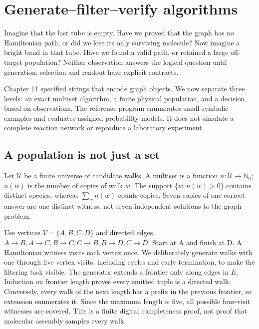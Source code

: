 \chapter{Generate--filter--verify algorithms}
Imagine that the last tube is empty. Have we proved that the graph has no
Hamiltonian path, or did we lose its only surviving molecule? Now imagine
a bright band in that tube. Have we found a valid path, or retained a large
off-target population? Neither observation answers the logical question until
generation, selection and readout have explicit contracts.

Chapter 11 specified strings that encode graph objects. We now separate
three levels: an exact multiset algorithm, a finite physical population,
and a decision based on observations. The reference program enumerates
small symbolic examples and evaluates assigned probability models. It does
not simulate a complete reaction network or reproduce a laboratory experiment.

\section{A population is not just a set}
Let $\mathcal U$ be a finite universe of candidate walks. A multiset is a
function $n:\mathcal U\to\mathbb N_0$; $n(w)$ is the number of copies of
walk $w$. The support $\{w:n(w)>0\}$ contains distinct species, whereas
$\sum_w n(w)$ counts copies. Seven copies of one correct answer are one
distinct witness, not seven independent solutions to the graph problem.

Use vertices $V=\{A,B,C,D\}$ and directed edges
$A\to B,A\to C,B\to C,C\to B,B\to D,C\to D$.
Start at A and finish at D. A Hamiltonian witness visits each vertex once.
We deliberately generate walks with one through five vertex visits,
including cycles and early termination, to make the filtering task visible.
The generator extends a frontier only along edges in $E$. Induction on
frontier length proves every emitted tuple is a directed walk. Conversely,
every walk of the next length has a prefix in the previous frontier, so
extension enumerates it. Since the maximum length is five, all possible
four-visit witnesses are covered. This is a finite digital completeness
proof, not proof that molecular assembly samples every walk.

